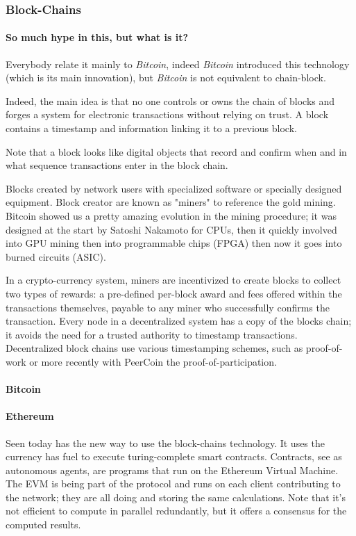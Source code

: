 \subsubsection{Block-Chains}

\paragraph{So much hype in this, but what is it?}
Everybody relate it mainly to \textit{Bitcoin}\cite{SatoshiNakamoto2008Bitcoin:System}, indeed \textit{Bitcoin} introduced this technology (which is its main innovation), but \textit{Bitcoin} is not equivalent to chain-block.

Indeed, the main idea is that no one controls or owns the chain of blocks and forges a system for electronic transactions without relying on trust. A block contains a timestamp and information linking it to a previous block.

Note that a block looks like digital objects that record and confirm when and in what sequence transactions enter in the block chain. 

Blocks created by network users with specialized software or specially designed equipment. Block creator are known as "miners" to reference the gold mining. Bitcoin showed us a pretty amazing evolution in the mining procedure; it was designed at the start by Satoshi Nakamoto for CPUs, then it quickly involved into GPU mining then into programmable chips (FPGA) then now it goes into burned circuits (ASIC).

In a crypto-currency system, miners are incentivized to create blocks to collect two types of rewards: a pre-defined per-block award and fees offered within the transactions themselves, payable to any miner who successfully confirms the transaction.
Every node in a decentralized system has a copy of the blocks chain; it avoids the need for a trusted authority to timestamp transactions. Decentralized block chains use various timestamping schemes, such as proof-of-work or more recently with PeerCoin the proof-of-participation.

\paragraph{Bitcoin \cite{SatoshiNakamoto2008Bitcoin:System}}


\paragraph{Ethereum \cite{Ethereum2016EthereumDocumentation}}
Seen today has the new way to use the block-chains technology. It uses the currency has fuel to execute turing-complete smart contracts. Contracts, see as autonomous agents, are programs that run on the Ethereum Virtual Machine. The EVM is being part of the protocol and runs on each client contributing to the network; they are all doing and storing the same calculations. Note that it's not efficient to compute in parallel redundantly, but it offers a consensus for the computed results. 

